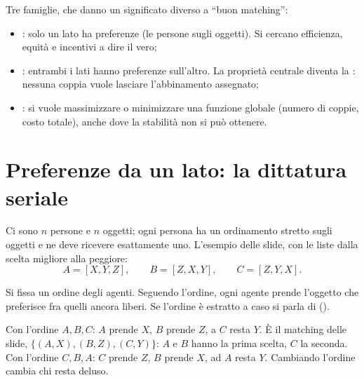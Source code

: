 Tre famiglie, che danno un significato diverso a ``buon matching'':
\begin{itemize}
  \item {}: solo un lato ha preferenze (le persone sugli oggetti).
        Si cercano efficienza, equità e incentivi a dire il vero;
  \item {}: entrambi i lati hanno preferenze sull'altro. La
        proprietà centrale diventa la : nessuna coppia vuole lasciare
        l'abbinamento assegnato;
  \item {}: si vuole massimizzare o minimizzare una funzione globale
        (numero di coppie, costo totale), anche dove la stabilità non si può ottenere.
\end{itemize}

\section{Preferenze da un lato: la dittatura seriale}

Ci sono $n$ persone e $n$ oggetti; ogni persona ha un ordinamento stretto sugli oggetti e
ne deve ricevere esattamente uno. L'esempio delle slide, con le liste dalla scelta migliore
alla peggiore:
\[
  A = [X, Y, Z], \qquad B = [Z, X, Y], \qquad C = [Z, Y, X].
\]

\begin{definizione}
Si fissa un ordine degli agenti. Seguendo l'ordine, ogni agente prende l'oggetto che
preferisce fra quelli ancora liberi. Se l'ordine è estratto a caso si parla di
 ().
\end{definizione}

\begin{esempio}
Con l'ordine $A, B, C$: $A$ prende $X$, $B$ prende $Z$, a $C$ resta $Y$. È il matching delle
slide, $\{(A,X), (B,Z), (C,Y)\}$: $A$ e $B$ hanno la prima scelta, $C$ la seconda. Con
l'ordine $C, B, A$: $C$ prende $Z$, $B$ prende $X$, ad $A$ resta $Y$. Cambiando l'ordine
cambia chi resta deluso.
\end{esempio}

